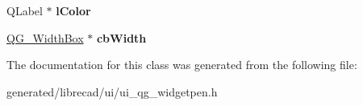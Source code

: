 \begin{DoxyCompactItemize}
\item 
\hypertarget{classUi__QG__WidgetPen_a5da544e69b506d93f836e4684719c17c}{Q\-Label $\ast$ {\bfseries l\-Color}}\label{classUi__QG__WidgetPen_a5da544e69b506d93f836e4684719c17c}

\item 
\hypertarget{classUi__QG__WidgetPen_adfcbc81b7ba0713baeefa577cb1b0db5}{\hyperlink{classQG__WidthBox}{Q\-G\-\_\-\-Width\-Box} $\ast$ {\bfseries cb\-Width}}\label{classUi__QG__WidgetPen_adfcbc81b7ba0713baeefa577cb1b0db5}

\end{DoxyCompactItemize}


The documentation for this class was generated from the following file\-:\begin{DoxyCompactItemize}
\item 
generated/librecad/ui/ui\-\_\-qg\-\_\-widgetpen.\-h\end{DoxyCompactItemize}
